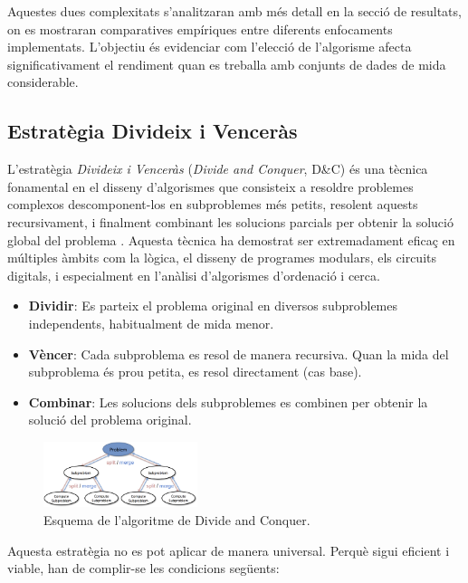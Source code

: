 \documentclass{ieeetj}
\begin{document}
Aquestes dues complexitats s’analitzaran amb més detall en la secció de resultats, on es mostraran comparatives empíriques entre diferents enfocaments implementats. L’objectiu és evidenciar com l’elecció de l’algorisme afecta significativament el rendiment quan es treballa amb conjunts de dades de mida considerable.

\subsection{Estratègia Divideix i Venceràs}

L’estratègia \textit{Divideix i Venceràs} (\textit{Divide and Conquer}, D\&C) és una tècnica fonamental en el disseny d’algorismes que consisteix a resoldre problemes complexos descomponent-los en subproblemes més petits, resolent aquests recursivament, i finalment combinant les solucions parcials per obtenir la solució global del problema \cite{DivideAndConquer}. Aquesta tècnica ha demostrat ser extremadament eficaç en múltiples àmbits com la lògica, el disseny de programes modulars, els circuits digitals, i especialment en l’anàlisi d’algorismes d’ordenació i cerca.

\begin{itemize}
    \item \textbf{Dividir}: Es parteix el problema original en diversos subproblemes independents, habitualment de mida menor.
    \item \textbf{Vèncer}: Cada subproblema es resol de manera recursiva. Quan la mida del subproblema és prou petita, es resol directament (cas base).
    \item \textbf{Combinar}: Les solucions dels subproblemes es combinen per obtenir la solució del problema original.
\end{itemize}

\begin{figure}[htbp]
    \centerline{\includegraphics[width=0.4\textwidth]{png/DC.png}}
    \caption{Esquema de l'algoritme de Divide and Conquer.}
    \label{fig:divideANDconquer}
\end{figure}

Aquesta estratègia no es pot aplicar de manera universal. Perquè sigui eficient i viable, han de complir-se les condicions següents:
\end{document}
